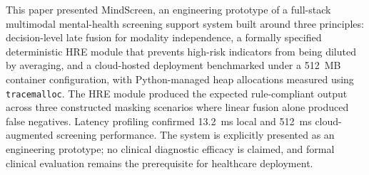 \documentclass[10pt, conference, letterpaper]{IEEEtran}
\begin{document}
This paper presented MindScreen, an engineering prototype of a full-stack
multimodal mental-health screening support system built around three principles:
decision-level late fusion for modality independence, a formally specified
deterministic HRE module that prevents high-risk indicators from being diluted
by averaging, and a cloud-hosted deployment benchmarked under a 512~MB container
configuration, with Python-managed heap allocations measured using \texttt{tracemalloc}.
The HRE module produced the expected rule-compliant output across three
constructed masking scenarios where linear fusion alone produced false negatives.
Latency profiling confirmed 13.2~ms local and 512~ms cloud-augmented
screening performance.
The system is explicitly presented as an engineering prototype; no clinical
diagnostic efficacy is claimed, and formal clinical evaluation remains the
prerequisite for healthcare deployment.
\end{document}
